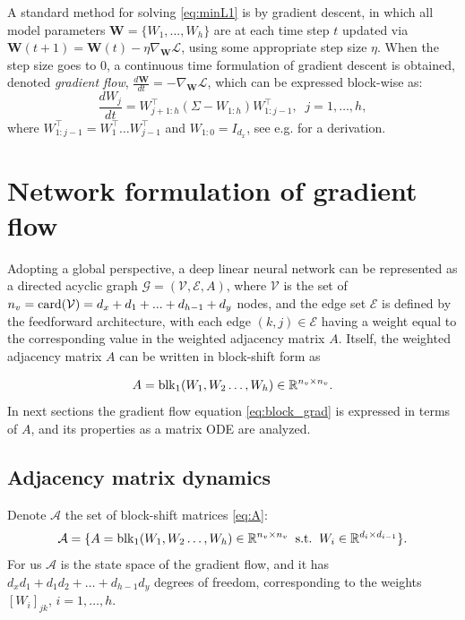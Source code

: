 \documentclass{article}
\def\block{{\rm blk}}
\newcommand{\1}{\mathds{1}}
\begin{document}
A standard method for solving \eqref{eq:minL1} is by gradient descent, in which all model parameters $\mathbf{W}=\{W_1,...,W_h\}$ are at each time step $t$ updated via
$\label{eq:descent}
\mathbf{W}(t+1)=\mathbf{W}(t)-\eta\nabla_\mathbf{W} \mathcal{L}
$, using some appropriate step size $\eta$. When the step size goes to 0, a continuous time formulation of gradient descent is obtained, denoted {\em gradient flow}, 
$\label{eq:flow}
\frac{d\mathbf{W}}{dt} = -\nabla_{\mathbf{W}}\mathcal{L}
$, 
which can be expressed block-wise as:
\begin{equation}\label{eq:block_grad}
    \frac{dW_j}{dt} = W_{j+1:h}^\top(\Sigma-W_{1:h})W_{1:j-1}^\top, \;\; j=1, \ldots, h,
\end{equation}
where $ W_{1:j-1}^\top = W_{1}^\top \dots W_{j-1}^\top$ and $ W_{1:0} =I_{d_x}$, see e.g.  \cite{saxe2013exact,arora2018convergence,chitour2018geometric} for a derivation.


\section{Network formulation of gradient flow}
\label{sec:adjacency}

Adopting a global perspective, a deep linear neural network can be represented as a directed acyclic graph $\mathcal{G}=(\mathcal{V},\mathcal{E}, A)$, where $\mathcal{V}$ is the set of $ n_v={\rm card}(\mathcal{ V})=d_x+d_1+...+d_{h-1}+d_y$ nodes, and the edge set $\mathcal{E}$ is defined by the feedforward architecture, with each edge $(k,j)\in \mathcal{E}$ having a weight equal to the corresponding value in the weighted adjacency matrix $A $. Itself, the weighted adjacency matrix $A$ can be written in block-shift form as

\begin{equation}
	A=\block_1 (W_1, W_2 \ldots, W_h) 
 \in \mathbb{R}^{n_v \times n_v}.
 \label{eq:A}
\end{equation}
In next sections the gradient flow equation \eqref{eq:block_grad} is expressed in terms of $A$, and its properties as a matrix ODE are analyzed.



\subsection{Adjacency matrix dynamics}

Denote $ \mathcal{A}$ the set of block-shift matrices \eqref{eq:A}: 
\[
\mathcal{A}= \{ A=\block_1 (W_1, W_2 \ldots, W_h) \in \mathbb{R}^{n_v \times n_v} \;\;\text{s.t.} \; \; W_i \in \mathbb{R}^{d_i \times d_{i-1} } \}.
\]
For us $ \mathcal{A} $ is the state space of the gradient flow, and it has $ d_x d_1 + d_1 d_2 + \ldots + d_{h-1} d_y $ degrees of freedom, corresponding to the weights $ [W_i]_{jk}$, $ i=1, \ldots, h$.
\end{document}
